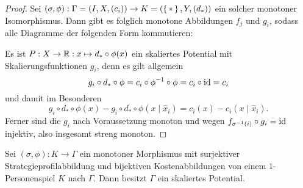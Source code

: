 \begin{proof}
	Sei $(\sigma, \phi): \Gamma =(I, X, (c_i)) \to K = (\set{\ast}, Y, (d_\ast))$ ein solcher monotoner Isomorphismus. Dann gibt es folglich monotone Abbildungen $f_j$ und $g_i$, sodass alle Diagramme der folgenden Form kommutieren:
	\begin{center}
	\end{center}
	Es ist $P: X \to \mathbb{R}: x \mapsto d_\ast \circ \phi(x)$ ein skaliertes Potential mit Skalierungsfunktionen $g_i$, denn es gilt allgemein
		\[g_i \circ d_\ast \circ \phi = c_i \circ \phi^{-1} \circ \phi = c_i \circ \mathrm{id} = c_i \]
	und damit im Besonderen
		\[g_i \circ d_\ast \circ \phi(x) - g_i \circ d_\ast \circ \phi(x \mid \hat{x}_i) = c_i(x) - c_i(x \mid \hat{x}_i) .\]
	Ferner sind die $g_i$ nach Voraussetzung monoton und wegen $f_{\sigma^{-1}(i)} \circ g_i = \mathrm{id}$ injektiv, also insgesamt streng monoton.
\end{proof}

\begin{kor}\label{kor:skalPotWennMon1PerMorph}
	Sei $(\sigma, \phi): K \to \Gamma$ ein monotoner Morphismus mit surjektiver Strategieprofilabbildung und bijektiven Kostenabbildungen von einem $1$-Personenspiel $K$ nach $\Gamma$. Dann besitzt $\Gamma$ ein skaliertes Potential.
\end{kor}

